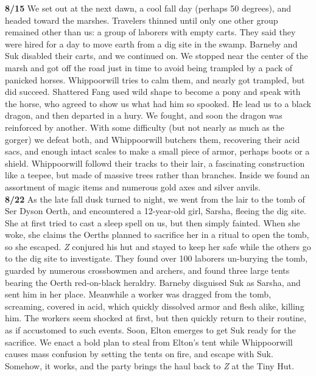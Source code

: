 \documentclass[letterpaper]{article}
\begin{document}
\noindent \textbf{8/15} We set out at the next dawn, a cool fall day (perhaps 50 degrees), and headed toward the marshes.  Travelers thinned until only one other group remained other than us: a group of laborers with empty carts.  They said they were hired for a day to move earth from a dig site in the swamp.  Barneby and Suk disabled their carts, and we continued on.  We stopped near the center of the marsh and got off the road just in time to avoid being trampled by a pack of panicked horses.  Whippoorwill tries to calm them, and nearly got trampled, but did succeed.  Shattered Fang used wild shape to become a pony and speak with the horse, who agreed to show us what had him so spooked.  He lead us to a black dragon, and then departed in a hury.  We fought, and soon the dragon was reinforced by another.  With some difficulty (but not nearly as much as the gorger) we defeat both, and Whippoorwill butchers them, recovering their acid sacs, and enough intact scales to make a small piece of armor, perhaps boots or a shield.  Whippoorwill followd their tracks to their lair, a fascinating construction like a teepee, but made of massive trees rather than branches.  Inside we found an assortment of magic items and numerous gold axes and silver anvils.\\

\noindent \textbf{8/22} As the late fall dusk turned to night, we went from the lair to the tomb of Ser Dyson Oerth, and encountered a 12-year-old girl, Sarsha, fleeing the dig site. She at first tried to cast a sleep spell on us, but then simply fainted. When she woke, she claims the Oerths planned to sacrifice her in a ritual to open the tomb, so she escaped.  \emph{Z} conjured his hut and stayed to keep her safe while the others go to the dig site to investigate. They found over 100 laborers un-burying the tomb, guarded by numerous crossbowmen and archers, and found three large tents bearing the Oerth red-on-black heraldry.  Barneby disguised Suk as Sarsha, and sent him in her place. Meanwhile a worker was dragged from the tomb, screaming, covered in acid, which quickly dissolved armor and flesh alike, killing him.  The workers seem shocked at first, but then quickly return to their routine, as if accustomed to such events.  Soon, Elton emerges to get Suk ready for the sacrifice.  We enact a bold plan to steal from Elton's tent while Whippoorwill causes mass confusion by setting the tents on fire, and escape with Suk.  Somehow, it works, and the party brings the haul back to \emph{Z} at the Tiny Hut.\\
\end{document}
